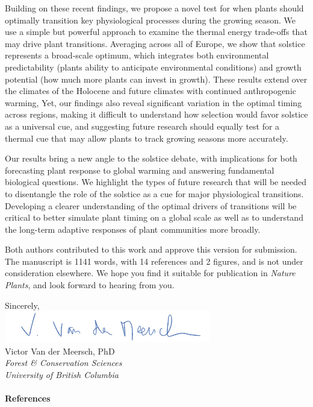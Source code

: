 \documentclass[11pt,a4paper]{article}
\begin{document}
\noindent Building on these recent findings, we propose a novel test for when plants should optimally transition key physiological processes during the growing season. We use a simple but powerful approach to  examine the thermal energy trade-offs that may drive plant transitions. %
Averaging across all of Europe, we show that solstice represents a broad-scale optimum, which integrates both environmental predictability (plants ability to anticipate environmental conditions) and growth potential (how much more plants can invest in growth). These results extend over the climates of the Holocene and future climates with continued anthropogenic warming, Yet, our findings also reveal significant variation in the optimal timing across regions, making it difficult to understand how selection would favor solstice as a universal cue, and suggesting future research should equally test for a thermal cue that may allow plants to track growing seasons more accurately.

\vspace{0.25cm}

\noindent Our results bring a new angle to the solstice debate, with implications for both forecasting plant response to global warming and answering fundamental biological questions. We highlight the types of future research that will be needed to disentangle the role of the solstice as a cue for major physiological transitions. Developing a clearer understanding of the optimal drivers of transitions will be critical to better simulate plant timing on a global scale as well as to understand the long-term adaptive responses of plant communities more broadly. 

\vspace{0.25cm}

\noindent Both authors contributed to this work and approve this version for submission. The manuscript is 1141 words, with 14 references and 2 figures, and is not under consideration elsewhere. We hope you find it suitable for publication in \emph{Nature Plants}, and look forward to hearing from you. 

\vspace{0.45cm}
\noindent Sincerely, 
\vspace{0.35cm}\\
\hspace*{-0.5cm}
\includegraphics[scale=.65]{sign_long.png} \\
\noindent Victor Van der Meersch, PhD\\
\noindent \emph{Forest \& Conservation Sciences}\\
\noindent \emph{University of British Columbia}

\clearpage

\paragraph{References}
\printbibliography[heading=none]


\newpage
\end{document}
